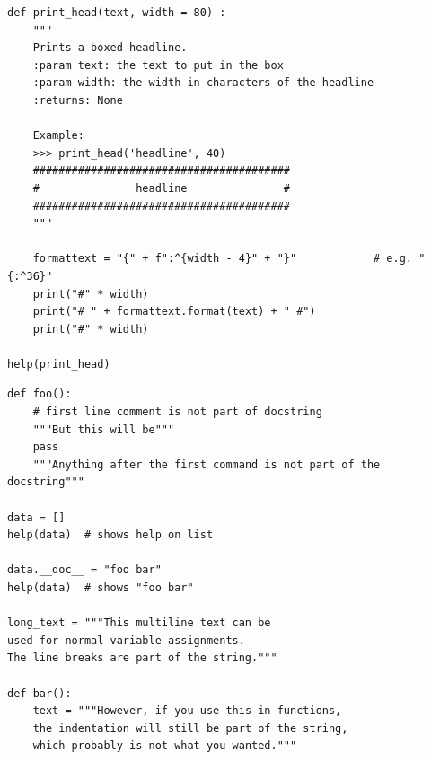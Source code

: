 \begin{frame}[fragile]
%
\begin{codebox}
\begin{verbatim}
def print_head(text, width = 80) :
    """
    Prints a boxed headline.
    :param text: the text to put in the box
    :param width: the width in characters of the headline
    :returns: None
    
    Example:
    >>> print_head('headline', 40)
    ########################################
    #               headline               #
    ########################################
    """
    
    formattext = "{" + f":^{width - 4}" + "}"            # e.g. "{:^36}"
    print("#" * width)
    print("# " + formattext.format(text) + " #")
    print("#" * width)

help(print_head)
\end{verbatim}
\end{codebox}
%
\end{frame}


\begin{frame}[fragile]
%
\begin{codebox}
\begin{verbatim}
def foo():
    # first line comment is not part of docstring
    """But this will be"""    
    pass
    """Anything after the first command is not part of the docstring"""

data = []
help(data)  # shows help on list

data.__doc__ = "foo bar"
help(data)  # shows "foo bar"

long_text = """This multiline text can be
used for normal variable assignments.
The line breaks are part of the string."""

def bar():
    text = """However, if you use this in functions,
    the indentation will still be part of the string,
    which probably is not what you wanted."""
\end{verbatim}
\end{codebox}
%
\end{frame}


